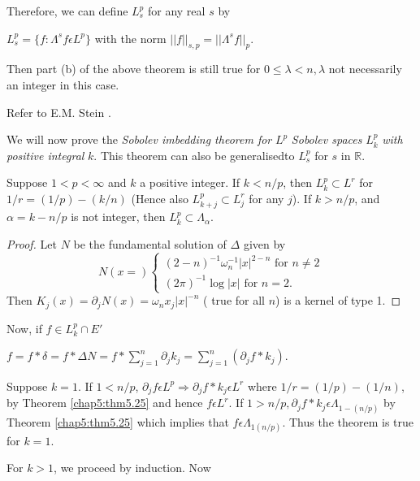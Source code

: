 Therefore, we can define $L^p_s$ for any real $s$ by

$ L^p_s = \{f:  \Lambda ^s f \epsilon L^p\}$ with the norm $ ||  f
||_{s,p}=  ||  \Lambda^s f  ||  _p$. 

Then part (b) of the above theorem is still true for $0 \le \lambda
< n, \lambda$ not necessarily an integer in this case. 

Refer to E.M. Stein \cite{2}.

We will now prove the \textit{ Sobolev imbedding theorem for} $L^p$
\textit{ Sobolev spaces} $L^p_k$ \textit{ with positive integral }
$k$. This theorem can also be generalised\pageoriginale to $L^{p}_{s}$ for $s$ in
$\mathbb{R}$.  

\setcounter{thm}{30}
\begin{thm}\label{chap5:thm5.31} %
  Suppose $1 < p < \infty$  and  $k$
  a positive integer.  If  $ k < n/p$,  then  $L^p_k\subset L^r$  for
  $1/r = (1/p) - (k/n)$  (Hence also $L^p_{k+j} \subset L^r_j$  for any
  $j$).  If  $ k > n/p$,  and  $\alpha = k- n/p$  is not integer, then
  $ L^p_k \subset  \Lambda _\alpha$.   
\end{thm}

\begin{proof}
  Let $N$ be the fundamental solution of $\Delta$ given by
  $$
  N(x=)
  \begin{cases}
    (2-n)^{-1} \omega ^{-1}_{n}  | x  | ^{2-n} \text{ for } n \neq 2\\
    (2\pi )^{-1} \log  | x  | \text{ for } n=2.
  \end{cases}
  $$
  Then $K_j(x)=\partial_j N(x)= \omega _n x_j  | x  | ^{-n}$ ( true for
  all $n$) is a kernel of type 1. 
\end{proof}

Now, if $f \in L^p_k \cap E'$

$f= f * \delta = f * \Delta N = f * \sum\limits^{n}_{j=1} \partial _j
k_j = \sum\limits ^{n}_{j=1} (\partial _j f * k_j)$. 

Suppose $k=1$. If $1 < n/p$, $ \partial_j f \epsilon L^p \Rightarrow
 \partial_j f * k_j \epsilon L^r$ where $1/r = (1/p)- (1/n)$, by
 Theorem \ref{chap5:thm5.25} and hence $ f \epsilon L^r$.   If  $1 > n/p,
 \partial _j f * k_j \epsilon  \Lambda _{1-(n/p)}$ by Theorem
 \ref{chap5:thm5.25} which implies that $ f \epsilon  \Lambda _{1(n/p)}$. 
Thus the theorem is true for $k = 1$.

For $k > 1 $, we proceed by induction. Now

